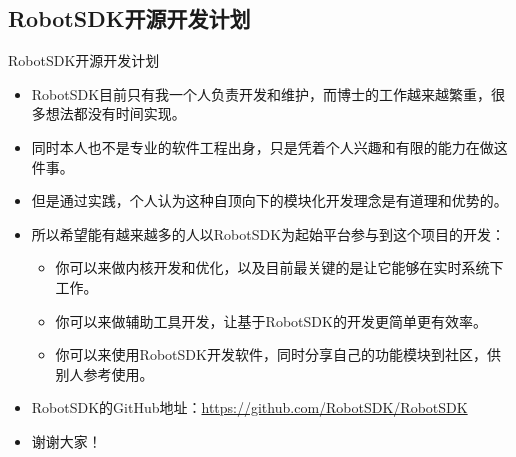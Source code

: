 \documentclass[9pt]{beamer}
\begin{document}
	\subsection{RobotSDK开源开发计划}
	\begin{frame}{RobotSDK开源开发计划}
		\begin{itemize}
			\item RobotSDK目前只有我一个人负责开发和维护，而博士的工作越来越繁重，很多想法都没有时间实现。
			\item 同时本人也不是专业的软件工程出身，只是凭着个人兴趣和有限的能力在做这件事。
			\item 但是通过实践，个人认为这种自顶向下的模块化开发理念是有道理和优势的。
			\item 所以希望能有越来越多的人以RobotSDK为起始平台参与到这个项目的开发：
			\begin{itemize}
				\item 你可以来做内核开发和优化，以及目前最关键的是让它能够在实时系统下工作。
				\item 你可以来做辅助工具开发，让基于RobotSDK的开发更简单更有效率。
				\item 你可以来使用RobotSDK开发软件，同时分享自己的功能模块到社区，供别人参考使用。
			\end{itemize}
			\item RobotSDK的GitHub地址：\url{https://github.com/RobotSDK/RobotSDK}
			\item 谢谢大家！
		\end{itemize}
	\end{frame}
	
\end{document}

